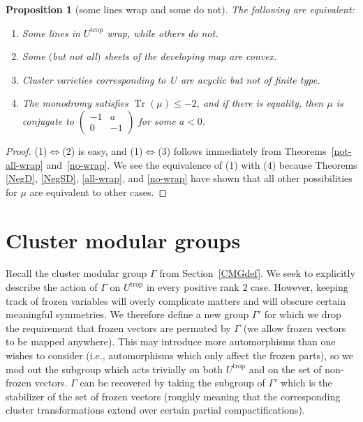 \documentclass[10pt,a4paper]{amsart}
\numberwithin{equation}{section}
\numberwithin{figure}{section}
\numberwithin{table}{section}
\DeclareMathOperator{\Tr}{Tr}
\DeclareMathOperator{\trop}{trop}
\newtheorem{prop}[thm]{Proposition}
\theoremstyle{definition}
\begin{document}
\begin{prop}[some lines wrap and some do not]\label{SomeWrap} The following are equivalent:
\begin{enumerate}\itemsep=0pt
\item[$1.$] Some {lines} in $U^{\trop}$ wrap, while others do not.
\item[$2.$] Some $($but not all$)$ sheets of the {developing map} are convex.
\item[$3.$] Cluster varieties corresponding to~$U$ are {acyclic} but not of {finite type}.
\item[$4.$] The {monodromy} satisfies $\Tr(\mu) \leq -2$, and if there is equality, then $\mu$ is conjugate to $
	\left(\begin{smallmatrix}
		-1 &a \\
		0 &-1
		\end{smallmatrix}\right)$ for some $a<0$.
\end{enumerate}
\end{prop}
\begin{proof}(1)$\Leftrightarrow$(2) is easy, and (1)$\Leftrightarrow$(3) follows immediately from Theorems~\ref{not-all-wrap} and~\ref{no-wrap}. We see the equivalence of (1) with (4) because Theorems \ref{NegD}, \ref{NegSD}, \ref{all-wrap}, and \ref{no-wrap} have shown that all other possibilities for $\mu$ are equivalent to other cases.
\end{proof}

\section{Cluster modular groups}\label{CMG}

Recall the cluster modular group $\Gamma$ from Section~\ref{CMGdef}. We seek to explicitly describe the action of $\Gamma$ on $U^{\trop}$ in every positive rank $2$ case. However, keeping track of frozen variables will overly complicate matters and will obscure certain meaningful symmetries. We therefore define a new group $\Gamma'$ for which we drop the requirement that frozen vectors are permuted by $\Gamma$ (we allow frozen vectors to be mapped anywhere). This may introduce more automorphisms than one wishes to consider (i.e., automorphisms which only affect the frozen parts), so we mod out the subgroup which acts trivially on both $U^{\trop}$ and on the set of non-frozen vectors. $\Gamma$ can be recovered by taking the subgroup of $\Gamma'$ which is the stabilizer of the set of frozen vectors (roughly meaning that the corresponding cluster transformations extend over certain partial compactifications).
\end{document}
